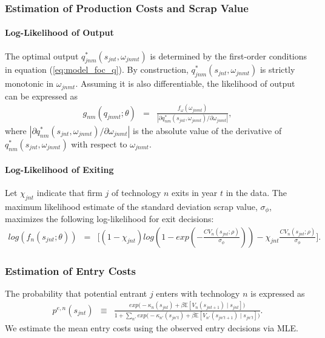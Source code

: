\documentclass[12pt]{article}
\begin{document}
\subsubsection{Estimation of Production Costs and Scrap Value}

\paragraph{Log-Likelihood of Output}
The optimal output $q^*_{jnm}(s_{jnt},\omega_{jnmt})$ is determined by the first-order conditions in equation (\ref{eq:model_foc_q}). By construction, $q^*_{jnm}(s_{jnt},\omega_{jnmt})$ is strictly monotonic in $\omega_{jnmt}$. Assuming it is also differentiable,  the likelihood of output can be expressed as
\begin{eqnarray}
    g_{nm}(q_{jnmt};\theta) &=& \frac{f_\omega(\omega_{jnmt})}{|\partial q_{nm}^*(s_{jnt},\omega_{jnmt}) /\partial \omega_{jnmt}|},\label{eq:est_log_likelihood_output}
\end{eqnarray}
where $|\partial q_{nm}^*(s_{jnt},\omega_{jnmt}) /\partial \omega_{jnmt}|$ is the absolute value of the derivative of $q_{nm}^*(s_{jnt},\omega_{jnmt})$ with respect to $\omega_{jnmt}$.

\paragraph{Log-Likelihood of Exiting}
Let $\chi_{jnt}$ indicate that firm $j$ of technology $n$ exits in year $t$ in the data. The maximum likelihood estimate of the standard deviation scrap value, $\sigma_\phi$, maximizes the following log-likelihood for exit decisions:
\begin{eqnarray}
    log(f_n(s_{jnt};\theta)) &=& \Big[ (1-\chi_{jnt}) log(1-exp(-\frac{CV_n(s_{jnt};\rho)}{\sigma_\phi})) - \chi_{jnt} \frac{CV_n(s_{jnt};\rho)}{\sigma_\phi} \Big]. \label{eq:est_log_likelihood_exit}   
\end{eqnarray}


\subsubsection{Estimation of Entry Costs}
The probability that potential entrant $j$ enters with technology $n$ is expressed as
\begin{eqnarray}
  p^{e,n}(s_{jnt}) & \equiv & \frac{exp\Big(-\kappa_n(s_{jnt}) + \beta \mathbb{E}[V_n(s_{jnt+1}) \mid s_{jnt}] \Big)}{1 + \sum_{n'} exp\Big(-\kappa_{n'}(s_{jn't}) + \beta \mathbb{E}[V_{n'}(s_{jn't+1}) \mid s_{jn't}]\Big)}. %
\end{eqnarray}
We estimate the mean entry costs using the observed entry decisions via MLE.
\end{document}
